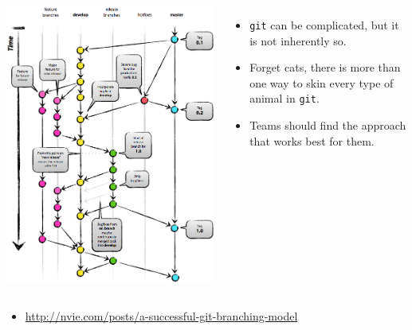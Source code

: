 \documentclass[mathserif]{beamer}
\begin{document}
\begin{frame}[fragile]
  \begin{columns}
    \includegraphics[width=\textwidth]{git_branching}
    \begin{itemize}\itemsep=.05\textheight
    \item \texttt{git} can be complicated, but it is not inherently so.
    \item Forget cats, there is more than one way to skin every type of animal in \texttt{git}.
    \item Teams should find the approach that works best for them.
    \end{itemize}
  \end{columns}
    \small
    \begin{itemize}
    \item \url{http://nvie.com/posts/a-successful-git-branching-model}
    \end{itemize}
\end{frame}
\end{document}
